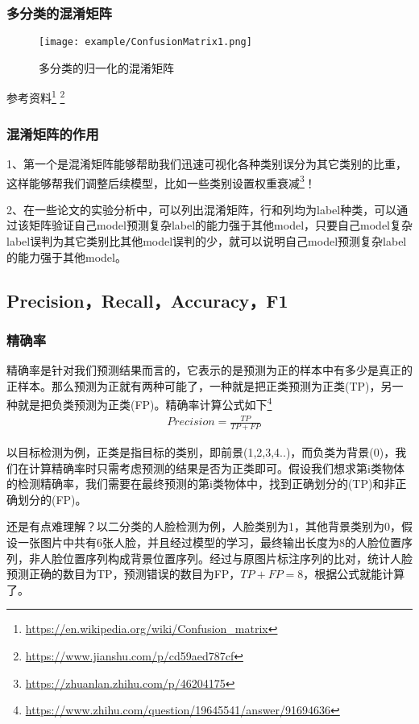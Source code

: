 \subsubsection{多分类的混淆矩阵}

\begin{figure}[!htp]
\centering
\texttt{[image: example/ConfusionMatrix1.png]}
\caption{多分类的归一化的混淆矩阵}
\label{fig1:3-15}
\end{figure}

参考资料\footnote{\url{https://en.wikipedia.org/wiki/Confusion_matrix}} \footnote{\url{https://www.jianshu.com/p/cd59aed787cf}}

\subsubsection{混淆矩阵的作用}

1、第一个是混淆矩阵能够帮助我们迅速可视化各种类别误分为其它类别的比重，这样能够帮我们调整后续模型，比如一些类别设置权重衰减\footnote{\url{https://zhuanlan.zhihu.com/p/46204175}}！

2、在一些论文的实验分析中，可以列出混淆矩阵，行和列均为label种类，可以通过该矩阵验证自己model预测复杂label的能力强于其他model，只要自己model复杂label误判为其它类别比其他model误判的少，就可以说明自己model预测复杂label的能力强于其他model。

\subsection{Precision，Recall，Accuracy，F1}

\subsubsection{精确率}

精确率是针对我们预测结果而言的，它表示的是预测为正的样本中有多少是真正的正样本。那么预测为正就有两种可能了，一种就是把正类预测为正类(TP)，另一种就是把负类预测为正类(FP)。精确率计算公式如下\footnote{\url{https://www.zhihu.com/question/19645541/answer/91694636}}
\begin{align}
& Precision = \frac{TP}{TP + FP}
\end{align}

以目标检测为例，正类是指目标的类别，即前景(1,2,3,4..)，而负类为背景(0)，我们在计算精确率时只需考虑预测的结果是否为正类即可。假设我们想求第i类物体的检测精确率，我们需要在最终预测的第i类物体中，找到正确划分的(TP)和非正确划分的(FP)。

还是有点难理解？以二分类的人脸检测为例，人脸类别为1，其他背景类别为0，假设一张图片中共有6张人脸，并且经过模型的学习，最终输出长度为8的人脸位置序列，非人脸位置序列构成背景位置序列。经过与原图片标注序列的比对，统计人脸预测正确的数目为TP，预测错误的数目为FP，$TP + FP = 8$，根据公式就能计算了。

